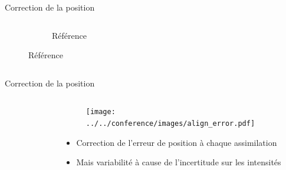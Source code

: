 \documentclass[aspectratio=169]{beamer} %
\begin{document}
\begin{frame}{Correction de la position}
\begin{columns}[c]
\begin{column}{0.55\textwidth}
\begin{figure}[c]
\begin{subfigure}{0.49\textwidth}
                    \caption*{\tiny Référence}
                \end{subfigure}
            \end{figure}
        \end{column}
    \end{columns}
    \vspace{-0.25cm}
\end{frame}

\begin{frame}{Correction de la position}
    \vspace{-0.5cm}
    \begin{columns}
        \begin{column}{0.5\textwidth}
            \begin{figure}
                \centering
            \end{figure}
        \end{column}
        \begin{column}{0.5\textwidth}
            \begin{figure}
                \centering
                \texttt{[image: ../../conference/images/align\_error.pdf]}
            \end{figure}
            \begin{itemize}
                \item Correction de l'erreur de position à chaque assimilation
                \item Mais variabilité à cause de l'incertitude sur les intensités
            \end{itemize}
        \end{column}
    \end{columns}
\end{frame}
\end{document}
